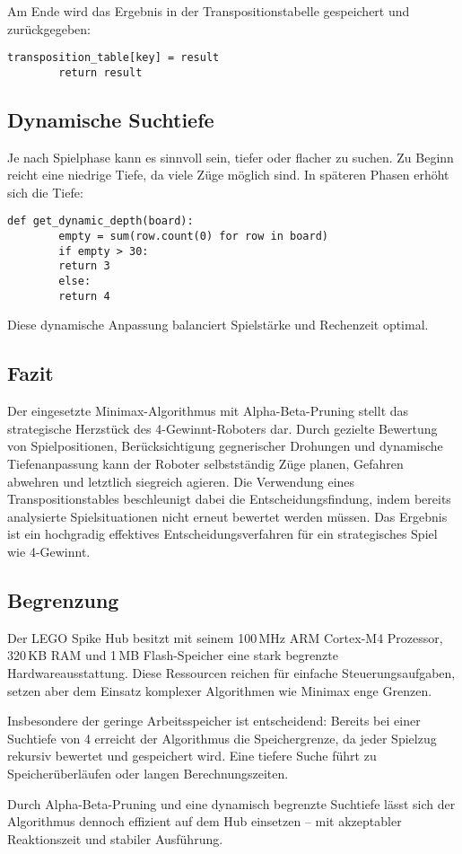 	Am Ende wird das Ergebnis in der Transpositionstabelle gespeichert und zurückgegeben:
	
	\begin{lstlisting}[style=pythonstyle]
		transposition_table[key] = result
		return result
	\end{lstlisting}
	
	\subsection*{Dynamische Suchtiefe}
	
	Je nach Spielphase kann es sinnvoll sein, tiefer oder flacher zu suchen. Zu Beginn reicht eine niedrige Tiefe, da viele Züge möglich sind. In späteren Phasen erhöht sich die Tiefe:
	
	\begin{lstlisting}[style=pythonstyle]
		def get_dynamic_depth(board):
		empty = sum(row.count(0) for row in board)
		if empty > 30:
		return 3
		else:
		return 4
	\end{lstlisting}
	
	Diese dynamische Anpassung balanciert Spielstärke und Rechenzeit optimal.
	
	\subsection*{Fazit}
	
	Der eingesetzte Minimax-Algorithmus mit Alpha-Beta-Pruning stellt das strategische Herzstück des 4-Gewinnt-Roboters dar. Durch gezielte Bewertung von Spielpositionen, Berücksichtigung gegnerischer Drohungen und dynamische Tiefenanpassung kann der Roboter selbstständig Züge planen, Gefahren abwehren und letztlich siegreich agieren. Die Verwendung eines Transpositionstables beschleunigt dabei die Entscheidungsfindung, indem bereits analysierte Spielsituationen nicht erneut bewertet werden müssen. Das Ergebnis ist ein hochgradig effektives Entscheidungsverfahren für ein strategisches Spiel wie 4-Gewinnt.
	
	
	\subsection{Begrenzung}
	Der LEGO Spike Hub besitzt mit seinem 100 MHz ARM Cortex-M4 Prozessor, 320 KB RAM und 1 MB Flash-Speicher eine stark begrenzte Hardwareausstattung. Diese Ressourcen reichen für einfache Steuerungsaufgaben, setzen aber dem Einsatz komplexer Algorithmen wie Minimax enge Grenzen.
	
	Insbesondere der geringe Arbeitsspeicher ist entscheidend: Bereits bei einer Suchtiefe von 4 erreicht der Algorithmus die Speichergrenze, da jeder Spielzug rekursiv bewertet und gespeichert wird. Eine tiefere Suche führt zu Speicherüberläufen oder langen Berechnungszeiten.
	
	Durch Alpha-Beta-Pruning und eine dynamisch begrenzte Suchtiefe lässt sich der Algorithmus dennoch effizient auf dem Hub einsetzen – mit akzeptabler Reaktionszeit und stabiler Ausführung.


	



